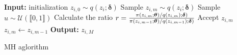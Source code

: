 \documentclass[11pt]{article}
\theoremstyle{t}
\begin{document}
\begin{algorithm}[H]
\begin{algorithmic}[1]
\STATE \textbf{Input:} initialization $z_{i,0} \sim q(z_{i}; {\bm \delta})$
\STATE Sample $z_{i,m} \sim q(z_{i}; {\bm \delta})$
\STATE Sample $u \sim \mathcal{U}(\llbracket 0, 1 \rrbracket)$
\STATE Calculate the ratio $r = \frac{\pi(z_{i,m}; {\bm{\theta}})/q(z_{i,m}); {\bm \delta})}{\pi(z_{i,m-1}; {\bm{\theta}})/q(z_{i,m-1}); {\bm \delta})}$
\STATE Accept $z_{i,m}$
\ELSE
\STATE $z_{i,m} \leftarrow z_{i,m-1}$
\ENDIF
\ENDFOR
\STATE \textbf{Output:} $z_{i,M}$
\end{algorithmic}
\caption{MH aglorithm}
\label{alg:mh}
        \end{algorithm}
\end{document}
